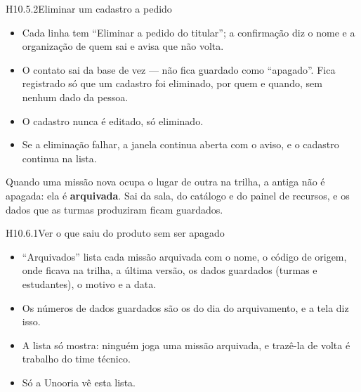 \begin{historia}{H10.5.2}{Eliminar um cadastro a pedido}{\pronto}
\aceite
\begin{itemize}
  \item Cada linha tem \enquote{Eliminar a pedido do titular}; a confirmação
    diz o nome e a organização de quem sai e avisa que não volta.
  \item O contato sai da base de vez --- não fica guardado como
    \enquote{apagado}. Fica registrado só que um cadastro foi eliminado, por
    quem e quando, sem nenhum dado da pessoa.
  \item O cadastro nunca é editado, só eliminado.
  \item Se a eliminação falhar, a janela continua aberta com o aviso, e o
    cadastro continua na lista.
\end{itemize}
\end{historia}


Quando uma missão nova ocupa o lugar de outra na trilha, a antiga não é apagada:
ela é \textbf{arquivada}. Sai da sala, do catálogo e do painel de recursos, e os
dados que as turmas produziram ficam guardados.

\begin{historia}{H10.6.1}{Ver o que saiu do produto sem ser apagado}{\pronto}
\aceite
\begin{itemize}
  \item \enquote{Arquivados} lista cada missão arquivada com o nome, o código de
    origem, onde ficava na trilha, a última versão, os dados guardados (turmas e
    estudantes), o motivo e a data.
  \item Os números de dados guardados são os do dia do arquivamento, e a tela
    diz isso.
  \item A lista só mostra: ninguém joga uma missão arquivada, e trazê-la de
    volta é trabalho do time técnico.
  \item Só a Unooria vê esta lista.
\end{itemize}
\end{historia}

